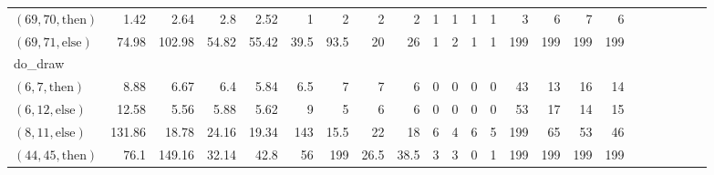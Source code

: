 \documentclass[sigconf]{acmart}
\newcommand{\thenBr}{\text{then}}
\newcommand{\elseBr}{\text{else}}
\begin{document}
\begin{table*}
{\begin{tabular}{l|rrrr|rrrr|rrrr|rrrr|r|r|r|r|r|r}
    $(69,70,\thenBr)$ & 1.42        & 2.64        & 2.8            & 2.52          & 1     & 2     & 2       & 2       & 1        & 1        & 1          & 1           & 3        & 6       & 7          & 6 & & & & & & \\
    $(69,71,\elseBr)$ & 74.98       & 102.98      & 54.82          & 55.42         & 39.5  & 93.5  & 20      & 26      & 1        & 2        & 1          & 1           & 199      & 199     & 199        & 199 & & & & & & \\
    \midrule
    \midrule
    do\_draw           &             &            &               &                &       &       &         &         &           &          &           &             &          &          &           & & & & & & & \\
    $(6,7,\thenBr)$    & 8.88        & 6.67       & 6.4           & 5.84           & 6.5   & 7     & 7       & 6       & 0         & 0        & 0         & 0           & 43       & 13       & 16        & 14 & & & & & & \\
    $(6,12,\elseBr)$   & 12.58       & 5.56       & 5.88          & 5.62           & 9     & 5     & 6       & 6       & 0         & 0        & 0         & 0           & 53       & 17       & 14        & 15 & & & & & & \\
    $(8,11,\elseBr)$   & 131.86      & 18.78      & 24.16         & 19.34          & 143   & 15.5  & 22      & 18      & 6         & 4        & 6         & 5           & 199      & 65       & 53        & 46 & & & & & &\\
    $(44,45,\thenBr)$  & 76.1        & 149.16     & 32.14         & 42.8           & 56    & 199   & 26.5    & 38.5    & 3         & 3        & 0         & 1           & 199      & 199      & 199       & 199 & & & & & & \\

\end{tabular}}
\end{table*}
\end{document}
